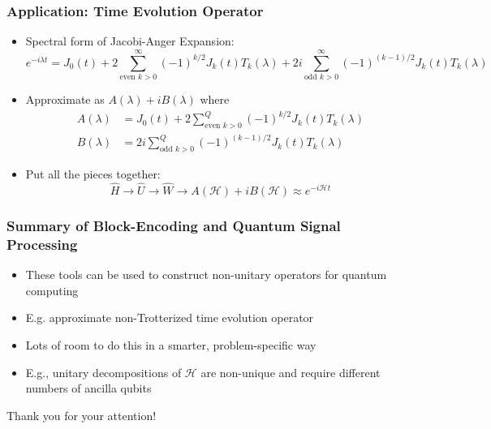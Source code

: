 \documentclass[aspectratio=169]{beamer}
\begin{document}
\begin{frame}
	\frametitle{Application: Time Evolution Operator}
	\begin{itemize}[<+->]
	\item Spectral form of Jacobi-Anger Expansion:
		\begin{equation}\nonumber
			e^{-i\lambda t} = J_0(t) + 2\sum_{\text{even }k >0}^{\infty}(-1)^{k/2}J_k(t)T_k(\lambda) + 2i\sum_{\text{odd }k >0}^{\infty}(-1)^{(k-1)/2}J_k(t)T_k(\lambda)
		\end{equation}
	\item Approximate as $A(\lambda)+iB(\lambda)$ where
	\begin{align}
		\nonumber A(\lambda) &=  J_0(t) + 2\sum_{\text{even }k >0}^{Q}(-1)^{k/2}J_k(t)T_k(\lambda)\\
		\nonumber B(\lambda) &=  2i\sum_{\text{odd }k >0}^{Q}(-1)^{(k-1)/2}J_k(t)T_k(\lambda)
	\end{align}
	\item Put all the pieces together:
		\begin{equation}\nonumber
			\hat{H}\rightarrow\hat{U}\rightarrow\hat{W}\rightarrow A(\mathcal{H})+iB(\mathcal{H})\approx e^{-i\mathcal{H}t}
		\end{equation}
	\end{itemize}
\end{frame}

\begin{frame}
	\frametitle{Summary of Block-Encoding and Quantum Signal Processing}
	\begin{itemize}[<+->]
	\item These tools can be used to construct non-unitary operators for quantum computing
	\item E.g. approximate non-Trotterized time evolution operator
	\item Lots of room to do this in a smarter, problem-specific way
	\item E.g., unitary decompositions of $\mathcal{H}$ are non-unique and require different numbers of ancilla qubits
	\end{itemize}
\end{frame}

\begin{frame}
\begin{center}
	\huge{Thank you for your attention!}
\end{center}
\end{frame}
\end{document}
